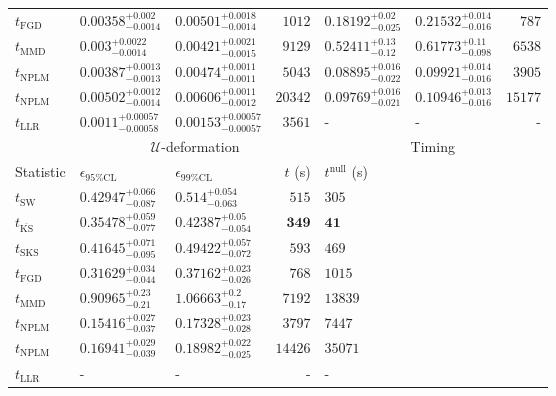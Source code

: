 \begin{tabular}{l|llr|llr}
	$t_{\mathrm{FGD}}$ & $0.00358_{-0.0014}^{+0.002}$ & $0.00501_{-0.0014}^{+0.0018}$ & $1012$ & ${\mathbf{0.18192_{-0.025}^{+0.02}}}$ & ${\mathbf{0.21532_{-0.016}^{+0.014}}}$ & $787$ \\
	$t_{\mathrm{MMD}}$ & ${\mathbf{0.003_{-0.0014}^{+0.0022}}}$ & ${\mathbf{0.00421_{-0.0015}^{+0.0021}}}$ & $9129$ & $0.52411_{-0.12}^{+0.13}$ & $0.61773_{-0.098}^{+0.11}$ & $6538$ \\
\rowcolor{red!35}	$t_{\mathrm{NPLM}}$ & $0.00387_{-0.0013}^{+0.0013}$ & $0.00474_{-0.0011}^{+0.0011}$ & $5043$ & $0.08895_{-0.022}^{+0.016}$ & $0.09921_{-0.016}^{+0.014}$ & $3905$ \\
\rowcolor{blue!35}	$t_{\mathrm{NPLM}}$ & $0.00502_{-0.0014}^{+0.0012}$ & $0.00606_{-0.0012}^{+0.0011}$ & $20342$ & $0.09769_{-0.021}^{+0.016}$ & $0.10946_{-0.016}^{+0.013}$ & $15177$ \\
	$t_{\mathrm{LLR}}$ & $0.0011_{-0.00058}^{+0.00057}$ & $0.00153_{-0.00057}^{+0.00057}$ & $3561$ & - & - & - \\
	\toprule
	\multicolumn{1}{c}{} & \multicolumn{3}{c}{$\mathcal{U}$-deformation} & \multicolumn{3}{c}{Timing} \\
	Statistic & $\epsilon_{95\%\mathrm{CL}}$ & $\epsilon_{99\%\mathrm{CL}}$ & $t$ (s) & $t^{\mathrm{null}}$ (s) \\
	\midrule
	$t_{\mathrm{SW}}$ & $0.42947_{-0.087}^{+0.066}$ & $0.514_{-0.063}^{+0.054}$ & $515$ & $305$ \\
	$t_{\overline{\mathrm{KS}}}$ & $0.35478_{-0.077}^{+0.059}$ & $0.42387_{-0.054}^{+0.05}$ & ${\mathbf{349}}$ & ${\mathbf{41}}$ \\
	$t_{\mathrm{SKS}}$ & $0.41645_{-0.095}^{+0.071}$ & $0.49422_{-0.072}^{+0.057}$ & $593$ & $469$ \\
	$t_{\mathrm{FGD}}$ & ${\mathbf{0.31629_{-0.044}^{+0.034}}}$ & ${\mathbf{0.37162_{-0.026}^{+0.023}}}$ & $768$ & $1015$ \\
	$t_{\mathrm{MMD}}$ & $0.90965_{-0.21}^{+0.23}$ & $1.06663_{-0.17}^{+0.2}$ & $7192$ & $13839$ \\
\rowcolor{red!35}	$t_{\mathrm{NPLM}}$ & $0.15416_{-0.037}^{+0.027}$ & $0.17328_{-0.028}^{+0.023}$ & $3797$ & $7447$ \\
\rowcolor{blue!35}	$t_{\mathrm{NPLM}}$ & $0.16941_{-0.039}^{+0.029}$ & $0.18982_{-0.025}^{+0.022}$ & $14426$ & $35071$ \\
	$t_{\mathrm{LLR}}$ & - & - & - & - \\
	\bottomrule
\end{tabular}
